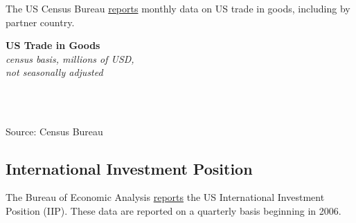 \documentclass{report}
\begin{document}
{{{{{{{\begin{minipage}{0.76\textwidth}

\small The US Census Bureau \href{https://www.census.gov/foreign-trade/data/index.html}{reports} monthly data on US trade in goods, including by partner country.  

\end{minipage}

\vspace{4mm}


\noindent \normalsize \textbf{US Trade in Goods} \hspace{12mm}  \hspace{18mm} \\
\footnotesize{\textit{census basis, millions of USD,}}\\
\footnotesize{\textit{not seasonally adjusted}}\\

\vspace{-3mm}

\noindent \hspace*{-3mm}  \setlength{\tabcolsep}{3.0pt} \color{black!90}
		{\renewcommand{\arraystretch}{1.54}
		 \begin{tabular}{p{30mm} R{12mm} R{12mm} R{12mm}  R{15mm} R{12mm} R{12mm}}
			 \hline
		\end{tabular}}	\\

\vspace{-3mm}		
		
\footnotesize{Source: Census Bureau}


\newpage

\begin{minipage}{0.76\textwidth}

\subsection*{\color{black!70} \seriffont International Investment Position}

\small The Bureau of Economic Analysis \href{https://www.bea.gov/data/intl-trade-investment/international-investment-position}{reports} the US International Investment Position (IIP). These data are reported on a quarterly basis beginning in 2006. \\ 

\vspace{1mm}


\end{minipage}}}}}}}}
\end{document}
